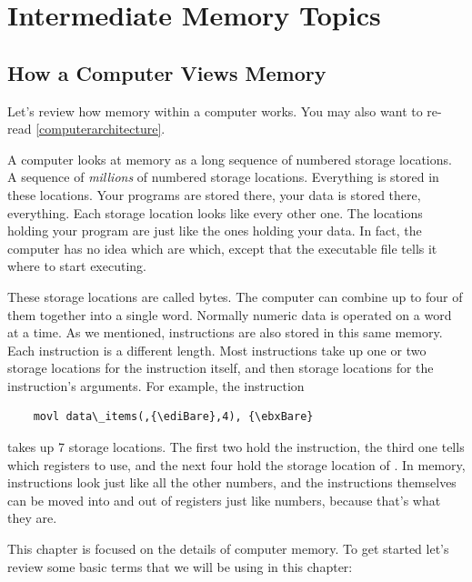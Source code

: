 \chapter{Intermediate Memory Topics}
\label{memoryintermediate}

\section{How a Computer Views Memory}

Let's review how memory within a computer works.  You may also want to
re-read \autoref{computerarchitecture}.

A computer looks at memory as a long sequence of numbered storage
locations.  A sequence of \emph{millions} of numbered
storage locations.  Everything is stored in these locations.  Your
programs are stored there, your data is stored there, everything.  
Each storage location looks like every other one.  The locations 
holding your program are just like the ones holding your data.  In
fact, the computer has no idea which are which, except that the
executable file tells it where to start executing.

These storage locations are called bytes.  The computer can combine
up to four of them together into a single word.  Normally numeric
data is operated on a word at a time.  As we mentioned, instructions
are also stored in this same memory.  Each instruction is a different
length.  Most instructions take up one or two storage locations for
the instruction itself, and then storage locations for the instruction's
arguments.  For example, the instruction

\begin{simpletyping}
\begin{lstlisting}
	movl data\_items(,{\ediBare},4), {\ebxBare}
\end{lstlisting}
\end{simpletyping}

takes up 7 storage locations.  The first two hold the instruction,
the third one tells which registers to use, and the next four hold
the storage location of .  In memory,
instructions look just like all the other numbers, and the instructions themselves
can be moved into and out of registers just like numbers, because that's
what they are.

This chapter is focused on the details of computer memory.  To get started
let's review some basic terms that we will be using in this chapter:

